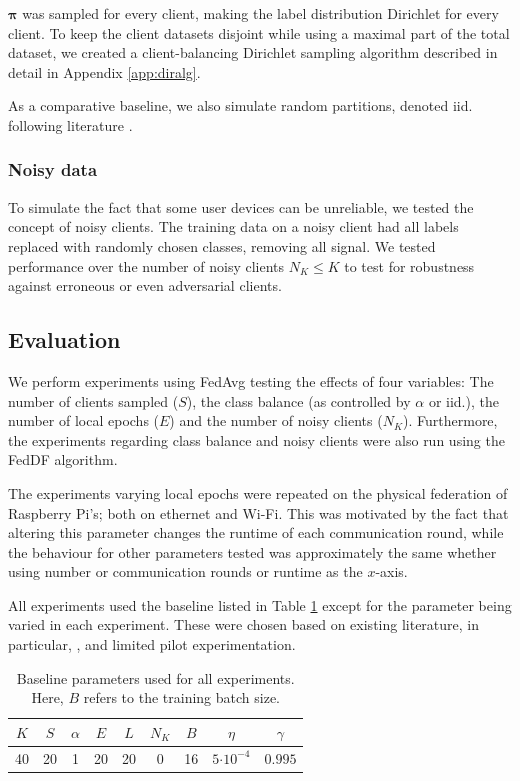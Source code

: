 \documentclass{article}
\newcommand{\ctp}[1]{\ensuremath{\cdot10^{#1}}}
\begin{document}
$\bm\pi$ was sampled for every client, making the label distribution Dirichlet for every client.
To keep the client datasets disjoint while using a maximal part of the total dataset, we created a client-balancing Dirichlet sampling algorithm described in detail in Appendix \ref{app:diralg}.

As a comparative baseline, we also simulate random partitions, denoted iid. following literature \cite{lin2020ensemble}.

\subsubsection{Noisy data}
To simulate the fact that some user devices can be unreliable, we tested the concept of noisy clients.
The training data on a noisy client had all labels replaced with randomly chosen classes, removing all signal.
We tested performance over the number of noisy clients $N_K\leq K$ to test for robustness against erroneous or even adversarial clients.

\subsection{Evaluation}
We perform experiments using FedAvg testing the effects of four variables: The number of clients sampled ($S$), the class balance (as controlled by $\alpha$ or iid.), the number of local epochs ($E$) and the number of noisy clients ($N_K$). 
Furthermore, the experiments regarding class balance and noisy clients were also run using the FedDF algorithm.

The experiments varying local epochs were repeated on the physical federation of Raspberry Pi's; both on ethernet and Wi-Fi.
This was motivated by the fact that altering this parameter changes the runtime of each communication round, while the behaviour for other parameters tested was approximately the same whether using number or communication rounds or runtime as the $x$-axis.

All experiments used the baseline listed in Table \ref{tab:baseline} except for the parameter being varied in each experiment.
These were chosen based on existing literature, in particular, \cite{mcmahan2017communication,lin2020ensemble}, and limited pilot experimentation.

\begin{table}[htb!]
    \centering
    \begin{tabular}{ccccccccc}
        $K$ & $S$ & $\alpha$ & $E$ & $L$ & $N_K$ & $B$ & $\eta$ & $\gamma$\\
        \hline
        40 & 20 & 1 & 20 & 20 & 0 & 16 & $5\ctp{-4}$ & $0.995$
    \end{tabular}
    \caption{Baseline parameters used for all experiments.
        Here, $B$ refers to the training batch size.}
    \label{tab:baseline}
\end{table}
\end{document}
